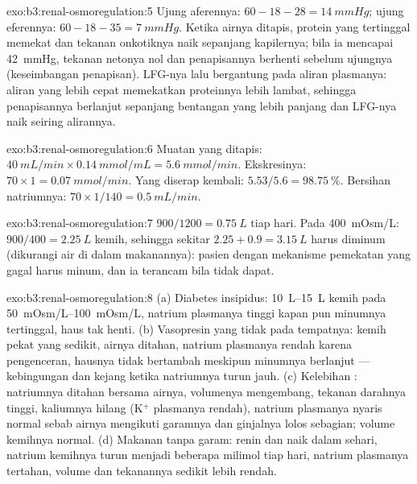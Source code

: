 \begin{solution}{exo:b3:renal-osmoregulation:5}
Ujung aferennya: $60 - 18 - 28 = \qty{14}{mmHg}$; ujung eferennya: $60 - 18 -
35 = \qty{7}{mmHg}$. Ketika airnya ditapis, protein yang tertinggal
memekat dan tekanan onkotiknya naik sepanjang kapilernya; bila ia
mencapai \qty{42}{mmHg}, tekanan netonya nol dan penapisannya berhenti
sebelum ujungnya (keseimbangan penapisan). LFG-nya lalu bergantung pada
aliran plasmanya: aliran yang lebih cepat memekatkan proteinnya lebih lambat, sehingga
penapisannya berlanjut sepanjang bentangan yang lebih panjang dan LFG-nya naik seiring
alirannya.
\end{solution}

\begin{solution}{exo:b3:renal-osmoregulation:6}
Muatan yang ditapis: $\qty{40}{mL/min}\times\qty{0.14}{mmol/mL} =
\qty{5.6}{mmol/min}$. Ekskresinya: $70\times 1 = \qty{0.07}{mmol/min}$.
Yang diserap kembali: $5.53/5.6 = \qty{98.75}{\%}$. Bersihan natriumnya: $70\times
1/140 = \qty{0.5}{mL/min}$.
\end{solution}

\begin{solution}{exo:b3:renal-osmoregulation:7}
$900/1200 = \qty{0.75}{L}$ tiap hari. Pada \qty{400}{mOsm/L}: $900/400 =
\qty{2.25}{L}$ kemih, sehingga sekitar $2.25 + 0.9 = \qty{3.15}{L}$ harus
diminum (dikurangi air di dalam makanannya): pasien dengan mekanisme
pemekatan yang gagal harus minum, dan ia terancam bila tidak dapat.
\end{solution}

\begin{solution}{exo:b3:renal-osmoregulation:8}
(a) Diabetes insipidus: \qtyrange{10}{15}{L} kemih pada
\qtyrange{50}{100}{mOsm/L}, natrium plasmanya tinggi kapan pun minumnya tertinggal,
haus tak henti. (b) Vasopresin yang tidak pada tempatnya: kemih pekat yang sedikit,
airnya ditahan, natrium plasmanya rendah karena pengenceran, hausnya tidak
bertambah meskipun minumnya berlanjut --- kebingungan dan kejang ketika
natriumnya turun jauh. (c) Kelebihan : natriumnya ditahan bersama airnya,
volumenya mengembang, tekanan darahnya tinggi, kaliumnya hilang (K$^{+}$ plasmanya
rendah), natrium plasmanya nyaris normal sebab airnya mengikuti garamnya dan
ginjalnya lolos sebagian; volume kemihnya normal. (d) Makanan tanpa garam: renin
dan  naik dalam sehari, natrium kemihnya turun menjadi beberapa
milimol tiap hari, natrium plasmanya tertahan, volume dan tekanannya sedikit
lebih rendah.
\end{solution}

